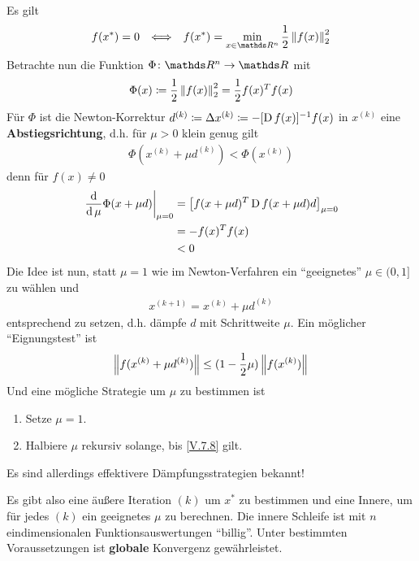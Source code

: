 Es gilt
\begin{align}
  f(x^{*}) &= 0 
  & \Longleftrightarrow & 
  & f(x^{*}) =\min_{x\in\Ren} \frac{1}{2} \nn[f(x)]_2^2
  \label{V.7.5}
\end{align}
Betrachte nun die Funktion $\Phi\colon\Ren\to \R$ mit 
\begin{gather*}
  \Phi (x) \coloneqq \frac{1}{2} \nn[f(x)]_2^2 
  = \frac{1}{2} f(x)^T f(x)
\end{gather*}
Für $\Phi$ ist die Newton-Korrektur
$d^{(k)} \coloneqq \Delta x^{(k)} \coloneqq -[\D f(x)]^{-1}f(x)$
in $x^{(k)} $ eine \textbf{Abstiegsrichtung},
d.h. für $\mu >0 $ klein genug gilt
\begin{gather}
  \Phi(x^{(k)}+\mu d^{(k)}) < \Phi(x^{(k)} )
  \label{V.7.6}
\end{gather}
denn für $ f(x)\neq 0$
\begin{align*}
  \left.\frac{\dd}{\dd\mu} \Phi(x+\mu d)\right\vert_{\mu = 0} 
  &= \left[f(x+\mu d)^T\D f(x+\mu d)d\right]_{\mu = 0}\\
  &= -f(x)^Tf(x) \\
  &< 0
\end{align*}
Die Idee ist nun, statt $\mu = 1$ wie im Newton-Verfahren
ein \enquote{geeignetes} $\mu \in (0,1]$ zu wählen und 
\begin{gather}
  x^{(k+1)} = x^{(k)} +\mu d^{(k)}
  \label{V.7.7}
\end{gather}
entsprechend zu setzen, d.h. dämpfe $d$ mit Schrittweite $\mu$.
Ein möglicher \enquote{Eignungstest} ist
\begin{gather}
  \nn[f(x^{(k)}+\mu d^{(k)})]
  \leq (1-\frac{1}{2}\mu )\nn[f(x^{(k)})]
  \label{V.7.8}
\end{gather}
Und eine mögliche Strategie um $\mu $ zu bestimmen ist 
\begin{enumerate}[1.]
\item Setze $\mu=1$.
\item Halbiere $\mu$ rekursiv solange, bis \eqref{V.7.8} gilt.
\end{enumerate}
Es sind allerdings effektivere Dämpfungsstrategien bekannt!

Es gibt also eine äußere Iteration $(k)$
um $x^{*}$ zu bestimmen und eine Innere,
um für jedes $(k)$ ein geeignetes $\mu$ zu berechnen.
Die innere Schleife ist mit $n$ eindimensionalen Funktionsauswertungen
\enquote{billig}.
Unter bestimmten Voraussetzungen ist
\textbf{globale} Konvergenz gewährleistet.

